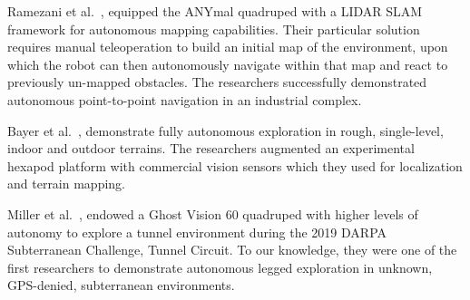 \documentclass[letterpaper, 10pt, conference]{ieeeconf}      %
\newcommand{\rev}[1]{{\color{blue} #1 }} %
\begin{document}
\rev{Ramezani et al.~\cite{Ramezani2020}, equipped the ANYmal quadruped with a LIDAR SLAM framework for autonomous mapping capabilities. Their particular solution requires manual teleoperation to build an initial map of the environment, upon which the robot can then autonomously navigate within that map and react to previously un-mapped obstacles. 
The researchers successfully demonstrated autonomous point-to-point navigation in an industrial complex.

Bayer et al.~\cite{Bayer2019}, demonstrate fully autonomous exploration in rough, single-level, indoor and outdoor terrains.
The researchers augmented an experimental hexapod platform with commercial vision sensors which they used for localization and terrain mapping.

Miller et al.~\cite{Miller2019}, 
endowed a Ghost Vision 60 quadruped with higher levels of autonomy to explore a tunnel environment during the 2019 DARPA Subterranean Challenge, Tunnel Circuit. To our knowledge, they were one of the first researchers to demonstrate  
autonomous legged exploration in unknown, GPS-denied, subterranean environments.} %
\end{document}
